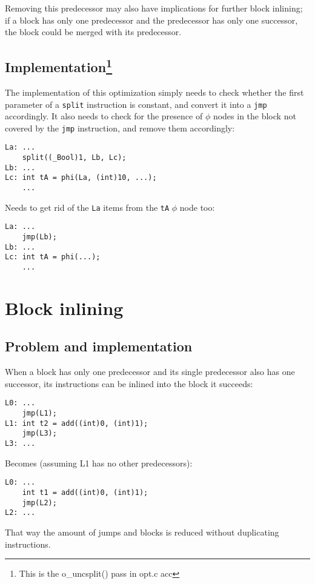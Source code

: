 \documentclass[12pt, a4paper]{article}
\begin{document}
Removing this predecessor may also have implications for further block inlining;
if a block has only one predecessor and the predecessor has only one successor,
the block could be merged with its predecessor.

\subsection[Implementation] {Implementation\footnote{This is the o\_uncsplit() pass in opt.c acc} }
The implementation of this optimization simply needs to check whether the first
parameter of a \verb+split+ instruction is constant, and convert it into a
\verb+jmp+ accordingly. It also needs to check for the presence of $\phi$ nodes
in the block not covered by the \verb+jmp+ instruction, and remove them accordingly:

\begin{lstlisting}
La:	...
	split((_Bool)1, Lb, Lc);
Lb:	...
Lc:	int tA = phi(La, (int)10, ...);
	...
\end{lstlisting}

Needs to get rid of the \verb+La+ items from the \verb+tA+ $\phi$ node too:

\begin{lstlisting}
La:	...
	jmp(Lb);
Lb:	...
Lc:	int tA = phi(...);
	...
\end{lstlisting}


\section{Block inlining}
\subsection{Problem and implementation}
When a block has only one predecessor and its single predecessor
also has one successor, its instructions can be inlined into the block it succeeds:

\begin{lstlisting}
L0:	...
	jmp(L1);
L1:	int t2 = add((int)0, (int)1);
	jmp(L3);
L3:	...
\end{lstlisting}

Becomes (assuming L1 has no other predecessors):

\begin{lstlisting}
L0:	...
	int t1 = add((int)0, (int)1);
	jmp(L2);
L2:	...
\end{lstlisting}

That way the amount of jumps and blocks is reduced without duplicating instructions.
\end{document}
